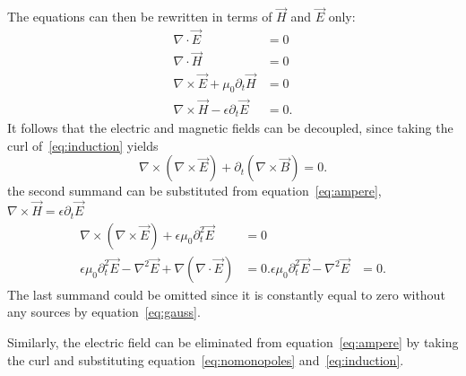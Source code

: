The equations can then be rewritten in terms of $\vec{H}$ and $\vec{E}$ only:
\begin{align}
    \nabla \cdot \vec{E} &= 0 \label{eq:gauss}\\
    \nabla \cdot \vec{H} &= 0 \label{eq:nomonopoles}\\
    \nabla \times \vec{E} + \mu_0\partial_t \vec{H} &= 0
    \label{eq:induction}\\
    \nabla \times \vec{H} - \epsilon\partial_t \vec{E} &= 0
    \label{eq:ampere}.
\end{align}
It follows that the electric and magnetic fields can be decoupled, since
taking the curl of~\eqref{eq:induction} yields
\begin{equation}
    \nabla \times (\nabla \times \vec{E}) + \partial_t(\nabla \times
    \vec{B}) = 0.
    \label{}
\end{equation}
the second summand can be substituted from equation~\eqref{eq:ampere},
$\nabla \times \vec{H} = \epsilon\partial_t \vec{E}$
\begin{align}
    \nabla \times (\nabla \times \vec{E}) + \epsilon\mu_0\partial_t^2 \vec{E} &= 0\\
    \epsilon\mu_0\partial_t^2 \vec{E} - \nabla^2 \vec{E} + \nabla (\nabla \cdot \vec{E}) &= 0.
    \epsilon\mu_0\partial_t^2 \vec{E} - \nabla^2 \vec{E} &= 0.
    \label{eq:wave-electric-field}
\end{align}
The last summand could be omitted since it is constantly equal to zero
without any sources by equation~\eqref{eq:gauss}.

Similarly, the electric field can be eliminated from
equation~\eqref{eq:ampere} by taking the curl and substituting
equation~\eqref{eq:nomonopoles} and~\eqref{eq:induction}.

